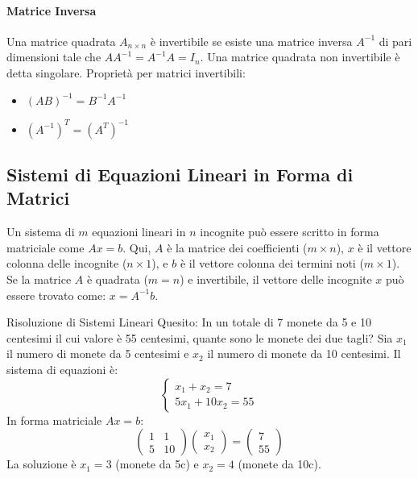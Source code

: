 \documentclass{article}
\begin{document}
\paragraph{Matrice Inversa} Una matrice quadrata $A_{n \times n}$ è invertibile se esiste una matrice inversa $A^{-1}$ di pari dimensioni tale che $A A^{-1} = A^{-1} A = I_n$.
Una matrice quadrata non invertibile è detta singolare.
Proprietà per matrici invertibili:
\begin{itemize}
    \item $(AB)^{-1} = B^{-1} A^{-1}$
    \item $(A^{-1})^T = (A^T)^{-1}$
\end{itemize}

\subsection{Sistemi di Equazioni Lineari in Forma di Matrici}
Un sistema di $m$ equazioni lineari in $n$ incognite può essere scritto in forma matriciale come $Ax = b$.
Qui, $A$ è la matrice dei coefficienti ($m \times n$), $x$ è il vettore colonna delle incognite ($n \times 1$), e $b$ è il vettore colonna dei termini noti ($m \times 1$).
Se la matrice $A$ è quadrata ($m=n$) e invertibile, il vettore delle incognite $x$ può essere trovato come: $x = A^{-1}b$.

\begin{examplebox}{Risoluzione di Sistemi Lineari}
    Quesito: In un totale di 7 monete da 5 e 10 centesimi il cui valore è 55 centesimi, quante sono le monete dei due tagli?
    Sia $x_1$ il numero di monete da 5 centesimi e $x_2$ il numero di monete da 10 centesimi.
    Il sistema di equazioni è:
    $$ \begin{cases} x_1 + x_2 = 7 \\ 5x_1 + 10x_2 = 55 \end{cases} $$
    In forma matriciale $Ax=b$:
    $$ \begin{pmatrix} 1 & 1 \\ 5 & 10 \end{pmatrix} \begin{pmatrix} x_1 \\ x_2 \end{pmatrix} = \begin{pmatrix} 7 \\ 55 \end{pmatrix} $$
    La soluzione è $x_1=3$ (monete da 5c) e $x_2=4$ (monete da 10c).
\end{examplebox}
\end{document}
